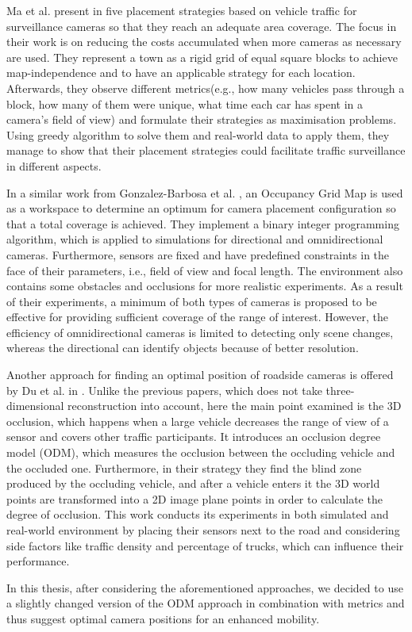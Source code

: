 Ma et al. present in \cite{surveillance_related_work} five placement strategies based on vehicle traffic for surveillance cameras so that they reach an adequate area coverage. The focus in their work is on reducing the costs accumulated when more cameras as necessary are used. They represent a town as a rigid grid of equal square blocks to achieve map-independence and to have an applicable strategy for each location. Afterwards, they observe different metrics(e.g., how many vehicles pass through a block, how many of them were unique, what time each car has spent in a camera's field of view) and formulate their strategies as maximisation problems. Using greedy algorithm to solve them and real-world data to apply them, they manage to show that their placement strategies could facilitate traffic surveillance in different aspects. 

In a similar work from Gonzalez-Barbosa et al. \cite{total_coverage_optimum}, an Occupancy Grid Map is used as a workspace to determine an optimum for camera placement configuration so that a total coverage is achieved. They implement a binary integer programming algorithm, which is applied to simulations for directional and omnidirectional cameras. Furthermore, sensors are fixed and have predefined constraints in the face of their parameters, i.e., field of view and focal length. The environment also contains some obstacles and occlusions for more realistic experiments. As a result of their experiments, a minimum of both types of cameras is proposed to be effective for providing sufficient coverage of the range of interest. However, the efficiency of omnidirectional cameras is limited to detecting only scene changes, whereas the directional can identify objects because of better resolution.

Another approach for finding an optimal position of roadside cameras is offered by Du et al. in  \cite{occlusion_degree_model}. Unlike the previous papers, which does not take three-dimensional reconstruction into account, here the main point examined is the 3D occlusion, which happens when a large vehicle decreases the range of view of a sensor and covers other traffic participants. It introduces an occlusion degree model (ODM), which measures the occlusion between the occluding vehicle and the occluded one. Furthermore, in their strategy they find the blind zone produced by the occluding vehicle, and after a vehicle enters it the 3D world points are transformed into a 2D image plane points in order to calculate the degree of occlusion. This work conducts its experiments in both simulated and real-world environment by placing their sensors next to the road and considering side factors like traffic density and percentage of trucks, which can influence their performance.

In this thesis, after considering the aforementioned approaches, we decided to use a slightly changed version of the ODM approach in combination with  metrics and thus suggest optimal camera positions for an enhanced mobility. 
